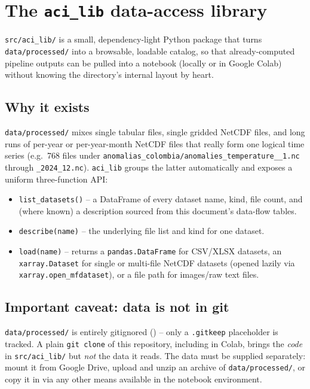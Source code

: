 \documentclass[11pt]{article}
\begin{document}
\section{The \texttt{aci\_lib} data-access library}
\label{sec:aci-lib}

\texttt{src/aci\_lib/} is a small, dependency-light Python package that
turns \texttt{data/processed/} into a browsable, loadable catalog, so that
already-computed pipeline outputs can be pulled into a notebook (locally or
in Google Colab) without knowing the directory's internal layout by heart.

\subsection{Why it exists}

\texttt{data/processed/} mixes single tabular files, single gridded
NetCDF files, and long runs of per-year or per-year-month NetCDF files that
really form one logical time series (e.g.\ 768 files under
\texttt{anomalias\_colombia/anomalies\_temperature\_\_1.nc}
through \texttt{\_2024\_12.nc}). \texttt{aci\_lib} groups the latter
automatically and exposes a uniform three-function API:

\begin{itemize}[leftmargin=*]
\item \texttt{list\_datasets()} -- a DataFrame of every dataset name, kind,
  file count, and (where known) a description sourced from this
  document's data-flow tables.
\item \texttt{describe(name)} -- the underlying file list and kind for one
  dataset.
\item \texttt{load(name)} -- returns a \texttt{pandas.DataFrame} for
  CSV/XLSX datasets, an \texttt{xarray.Dataset} for single or multi-file
  NetCDF datasets (opened lazily via \texttt{xarray.open\_mfdataset}), or a
  file path for images/raw text files.
\end{itemize}

\subsection{Important caveat: data is not in git}

\texttt{data/processed/} is entirely gitignored () --
only a \texttt{.gitkeep} placeholder is tracked. A plain \texttt{git clone}
of this repository, including in Colab, brings the \emph{code} in
\texttt{src/aci\_lib/} but \emph{not} the data it reads. The data must be
supplied separately: mount it from Google Drive, upload and unzip an
archive of \texttt{data/processed/}, or copy it in via any other means
available in the notebook environment.
\end{document}
